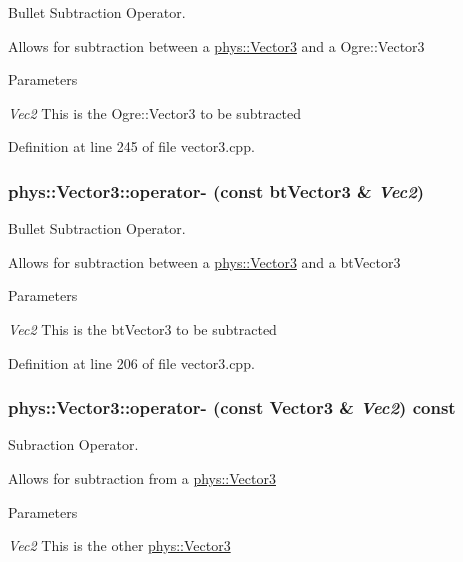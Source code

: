 Bullet Subtraction Operator. 

Allows for subtraction between a \hyperlink{classphys_1_1Vector3}{phys::Vector3} and a Ogre::Vector3 
\begin{DoxyParams}{Parameters}
\item[{\em Vec2}]This is the Ogre::Vector3 to be subtracted \end{DoxyParams}


Definition at line 245 of file vector3.cpp.

\hypertarget{classphys_1_1Vector3_ab7ec10d90e35c2b153a2f002f12518ce}{
\subsubsection[{operator-\/}]{ phys::Vector3::operator-\/ (const btVector3 \& {\em Vec2})}}
\label{d5/d6a/classphys_1_1Vector3_ab7ec10d90e35c2b153a2f002f12518ce}


Bullet Subtraction Operator. 

Allows for subtraction between a \hyperlink{classphys_1_1Vector3}{phys::Vector3} and a btVector3 
\begin{DoxyParams}{Parameters}
\item[{\em Vec2}]This is the btVector3 to be subtracted \end{DoxyParams}


Definition at line 206 of file vector3.cpp.

\hypertarget{classphys_1_1Vector3_aed320f9ac1374c0955a20aef50c05751}{
\subsubsection[{operator-\/}]{ phys::Vector3::operator-\/ (const {\bf Vector3} \& {\em Vec2}) const}}
\label{d5/d6a/classphys_1_1Vector3_aed320f9ac1374c0955a20aef50c05751}


Subraction Operator. 

Allows for subtraction from a \hyperlink{classphys_1_1Vector3}{phys::Vector3} 
\begin{DoxyParams}{Parameters}
\item[{\em Vec2}]This is the other \hyperlink{classphys_1_1Vector3}{phys::Vector3} \end{DoxyParams}


